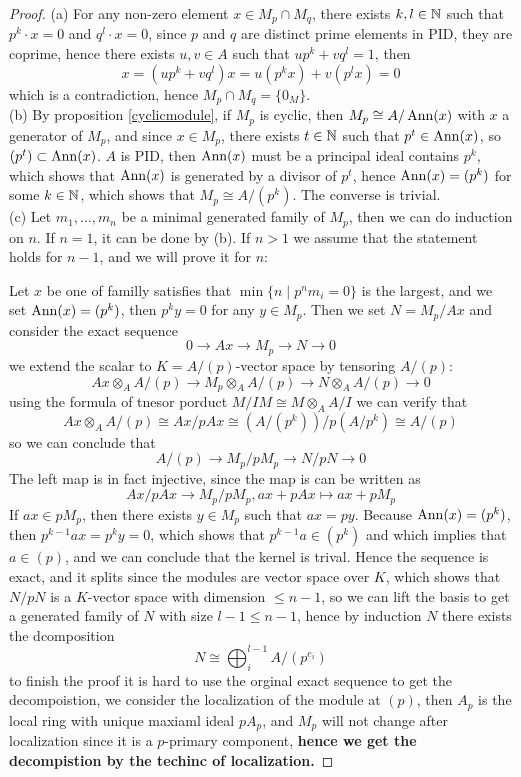 \documentclass[12pt,a4paper]{article}
\begin{document}
\begin{proof}
    (a) For any non-zero element \(x \in M_p \cap M_q\), there exists \(k,l \in \mathbb{N}\) such that \(p^k \cdot x = 0\) and \(q^l \cdot x = 0\), since \(p\) and \(q\) are distinct prime elements in PID, they are coprime, hence there exists \(u,v \in A\) such that \(up^k + vq^l = 1\), then
    \[x = (up^k+vq^l)x =u(p^kx)+v(p^lx) = 0\]
    which is a contradiction, hence \(M_p \cap M_q = \{0_M\}\).\\

    (b) By proposition \ref{cyclicmodule}, if \(M_p\) is cyclic, then \(M_p \cong A/\operatorname{Ann}(x)\) with \(x\) a generator of \(M_p\), and since \(x \in M_p\), there exists \(t \in \mathbb{N}\) such that \(p^t \in \operatorname{Ann}(x)\), so \((p^t) \subset \operatorname{Ann}(x)\). \(A\) is PID, then \(\operatorname{Ann}(x)\) must be a principal ideal contains \(p^k\), which shows that \(\operatorname{Ann}(x)\) is generated by a divisor of \(p^t\), hence \(\operatorname{Ann}(x) = (p^k)\) for some \(k \in \mathbb{N}\), which shows that \(M_p \cong A/(p^k)\). The converse is trivial.\\

    (c) Let \({m_1,\dots,m_n}\) be a minimal generated family of \(M_p\), then we can do induction on \(n\). If \(n = 1\), it can be done by (b). If \(n>1\) we assume that the statement holds for \(n-1\), and we will prove it for \(n\):

    Let \(x\) be one of familly satisfies that \(\min\{n \mid p^nm_i = 0\}\) is the largest, and we set \(\operatorname{Ann}(x) = (p^k)\), then \(p^ky = 0\) for any \(y \in M_p\). Then we set \(N = M_p/Ax\) and consider the exact sequence
    \[0 \to Ax \to M_p \to N \to 0\]
    we extend the scalar to \(K = A/(p)\)-vector space by tensoring \(A/(p)\):
    \[Ax \otimes_A A/(p) \to M_p \otimes_A A/(p) \to N \otimes_A A/(p) \to 0\]
    using the formula of tnesor porduct \(M/IM \cong M \otimes_A A/I\) we can verify that
    \[Ax \otimes_A A/(p) \cong Ax/pAx \cong (A/(p^k))/p(A/p^k) \cong A/(p)\]
    so we can conclude that 
    \[A/(p) \to M_p/pM_p \to N/pN \to 0\]
    The left map is in fact injective, since the map is can be written as
    \[Ax/pAx \to M_p/pM_p, ax + pAx \mapsto ax + pM_p\]
    If \(ax \in pM_p\), then there exists \(y \in M_p\) such that \(ax = py\). Because \(\operatorname{Ann}(x) = (p^k)\), then \(p^{k-1}ax = p^ky = 0\), which shows that \(p^{k-1}a \in (p^k)\) and which implies that \(a \in (p)\), and we can conclude that the kernel is trival. Hence the sequence is exact, and  it splits since the modules are vector space over \(K\), which shows that \(N/pN\) is a \(K\)-vector space with dimension \(\leq n-1\), so we can lift the basis to get a generated family of \(N\) with size \(l-1 \leq n-1\), hence by induction \(N\) there exists the dcomposition 
    \[N \cong \bigoplus_i^{l-1}A/(p^{e_i})\]
    to finish the proof it is hard to use the orginal exact sequence to get the decompoistion, we consider the localization of the module at \((p)\), then \(A_p\) is the local ring with unique maxiaml ideal \(pA_p\), and \(M_p\) will not change after localization since it is a \(p\)-primary component, \textbf{hence we get the decompistion by the techinc of localization.}
\end{proof}
\end{document}
